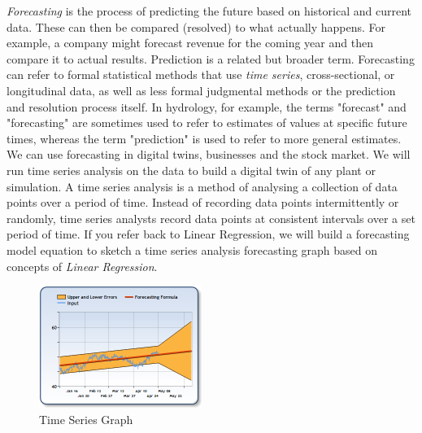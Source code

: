 \textit{Forecasting} is the process of predicting the future based on historical and current data. These can then be compared (resolved) to what actually happens. For example, a company might forecast revenue for the coming year and then compare it to actual results. Prediction is a related but broader term. Forecasting can refer to formal statistical methods that use \textit{time series}, cross-sectional, or longitudinal data, as well as less formal judgmental methods or the prediction and resolution process itself. In hydrology, for example, the terms "forecast" and "forecasting" are sometimes used to refer to estimates of values at specific future times, whereas the term "prediction" is used to refer to more general estimates.
We can use forecasting in digital twins, businesses and the stock market. We will run time series analysis on the data to build a digital twin of any plant or simulation.
A time series analysis is a method of analysing a collection of data points over a period of time. Instead of recording data points intermittently or randomly, time series analysts record data points at consistent intervals over a set period of time. If you refer back to Linear Regression, we will build a forecasting model equation to sketch a time series analysis forecasting graph based on concepts of \textit{Linear Regression}.


\begin{figure}[H]
    \begin{center}
    \includegraphics[width=200px]{images/timeseries.png}
    \end{center}
    \caption{Time Series Graph}
    \label{fig:timeseries}
\end{figure}

